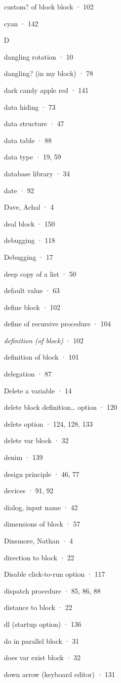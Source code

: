 custom? of block block · 102

cyan · 142

D

dangling rotation · 10

dangling? (in my block) · 78

dark candy apple red · 141

data hiding · 73

data structure · 47

data table · 88

data type · 19, 59

database library · 34

date · 92

Dave, Achal · 4

deal block · 150

debugging · 118

Debugging · 17

deep copy of a list · 50

default value · 63

define block · 102

define of recursive procedure · 104

\emph{definition (of block)} · 102

definition of block · 101

delegation · 87

Delete a variable · 14

delete block definition\ldots{} option · 120

delete option · 124, 128, 133

delete var block · 32

denim · 139

design principle · 46, 77

devices · 91, 92

dialog, input name · 42

dimensions of block · 57

Dinsmore, Nathan · 4

direction to block · 22

Disable click-to-run option · 117

dispatch procedure · 85, 86, 88

distance to block · 22

dl (startup option) · 136

do in parallel block · 31

does var exist block · 32

down arrow (keyboard editor) · 131

